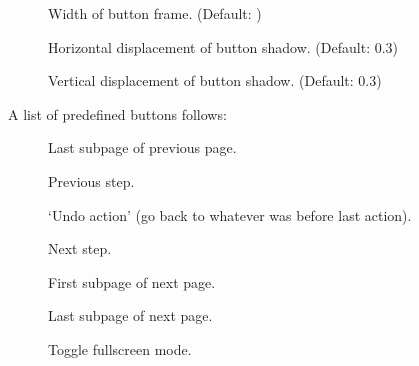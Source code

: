 \begin{slide}
\begin{description}
  \item[]
    Width of button frame. (Default: \code{0pt})

  \item[]
    Horizontal displacement of button shadow. (Default: 0.3)

  \item[]
    Vertical displacement of button shadow. (Default: 0.3)
  \end{description}

  A list of predefined buttons follows:
  \begin{description}

  \item[]
    Last subpage of previous page.

  \item[]
    Previous step.

  \item[]
    `Undo action' (go back to whatever was before last action).

  \item[]
    Next step.

  \item[]
    First subpage of next page.

  \item[]
    Last subpage of next page.

  \item[]
    Toggle fullscreen mode.

  \end{description}

\clearpage
\printindex
\end{slide}

\endinput
